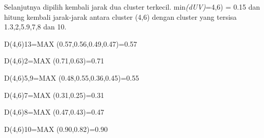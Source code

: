 \begin{enumerate}
\begin{table}[htbp]
\captionsetup{singlelinecheck=off}
\caption{Matrik Jarak, d(5,9)}
\label{tab:my-table}
\end{table}

Selanjutnya dipilih kembali jarak dua cluster terkecil. min\textit{(dUV)}=4,6) = 0.15 dan hitung kembali jarak-jarak antara cluster (4,6)  dengan cluster yang tersisa 1.3,2,5.9,7,8 dan 10.

D(4,6)13=MAX (0.57,0.56,0.49,0.47)=0.57

D(4,6)2=MAX (0.71,0.63)=0.71

D(4,6)5,9=MAX (0.48,0.55,0.36,0.45)=0.55

D(4,6)7=MAX (0.31,0.25)=0.31

D(4,6)8=MAX (0.47,0.43)=0.47

D(4,6)10=MAX (0.90,0.82)=0.90


\end{enumerate}
